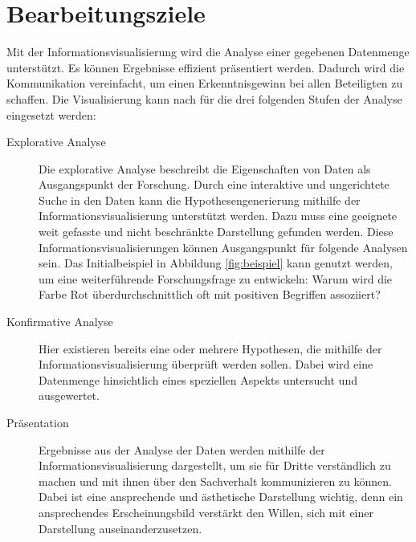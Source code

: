 \documentclass[a4paper, 
               12pt,
               DIV=calc,
               version=first,
               pdftex,
               headsepline,
               footsepline,
               bibtotocnumbered,
               liststotocnumbered]{scrreprt}
\begin{document}
\section{Bearbeitungsziele}
\label{sec:Ziele}
Mit der Informationsvisualisierung wird die Analyse einer gegebenen Datenmenge unterstützt.
Es können Ergebnisse effizient präsentiert werden. Dadurch wird die Kommunikation vereinfacht,
um einen Erkenntnisgewinn bei allen Beteiligten zu schaffen.
Die Visualisierung kann nach \cite{Schumann} für die drei folgenden Stufen der Analyse eingesetzt werden:
\begin{description}
\item[Explorative Analyse]
Die explorative Analyse beschreibt die Eigenschaften von Daten als Ausgangspunkt der Forschung.
Durch eine interaktive und ungerichtete Suche in den Daten
kann die Hypothesengenerierung mithilfe der Informationsvisualisierung unterstützt werden. Dazu muss eine
geeignete weit gefasste und nicht beschränkte Darstellung gefunden werden. Diese Informationsvisualisierungen
können Ausgangspunkt für folgende Analysen sein. Das Initialbeispiel in Abbildung \ref{fig:beispiel} kann
genutzt werden, um eine weiterführende Forschungsfrage zu entwickeln: Warum wird die Farbe Rot überdurchschnittlich
oft mit positiven Begriffen assoziiert?
\item[Konfirmative Analyse]
Hier existieren bereits eine oder mehrere Hypothesen, die mithilfe der Informationsvisualisierung überprüft werden sollen.
Dabei wird eine Datenmenge hinsichtlich eines speziellen Aspekts untersucht und ausgewertet.
\item[Präsentation]
Ergebnisse aus der Analyse der Daten werden mithilfe der Informationsvisualisierung dargestellt, um sie für Dritte verständlich
zu machen und mit ihnen über den Sachverhalt kommunizieren zu können.
Dabei ist eine ansprechende und ästhetische Darstellung wichtig, denn
ein ansprechendes Erscheinungsbild verstärkt den Willen, sich mit einer Darstellung auseinanderzusetzen.
\end{description}
\end{document}

